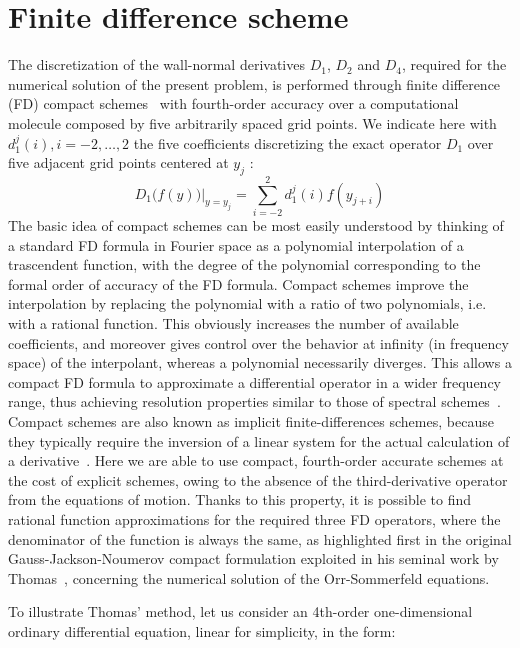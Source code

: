 \section{Finite difference scheme} \label{FD:scheme}
The discretization of the wall-normal derivatives $D_{1}$, $D_{2}$ and $D_{4}$, required for the numerical solution of the present problem, is performed through finite difference (FD) compact schemes~\cite{finite:difference:scheme} with fourth-order accuracy over a computational molecule composed by five arbitrarily spaced grid points. We indicate here with $d_{1}^{j} (i), i = -2, \dots , 2$ the five coefficients discretizing the exact operator $D_{1}$ over five adjacent grid points centered at $y_{j}$ :
\begin{equation}
D_{1} \big( f(y) \big) \vert_{y=y_{j}} = \sum_{i=-2}^{2} d_{1}^{j} (i) f(y_{j+i})
\end{equation}
The basic idea of compact schemes can be most easily understood by thinking of a standard FD formula in Fourier space as a polynomial interpolation of a trascendent function, with the degree of the polynomial corresponding to the formal order of accuracy of the FD formula. Compact schemes improve the interpolation by replacing the polynomial with a ratio of two polynomials, i.e. with a rational function. This obviously increases the number of available coefficients, and moreover gives control over the behavior at infinity (in frequency space) of the interpolant, whereas a polynomial necessarily diverges. This allows a compact FD formula to approximate a differential operator in a wider frequency range, thus achieving resolution properties similar to those of spectral schemes~\cite{finite:difference:scheme}.
Compact schemes are also known as implicit finite-differences schemes, because they typically require the inversion of a linear system for the actual calculation of a derivative~\cite{compact:difference}\cite{finite:difference:scheme}.
 Here we are able to use compact, fourth-order accurate schemes at the cost of explicit schemes, owing to the absence of the third-derivative operator from the equations of motion. Thanks to this property, it is possible to find rational function approximations for the required three FD operators, where the denominator of the function is always the same, as highlighted first in the original Gauss-Jackson-Noumerov compact formulation exploited in his seminal work by Thomas~\cite{Thomas:coeff}, concerning the numerical solution of the Orr-Sommerfeld equations.\par
To illustrate Thomas’ method, let us consider an 4th-order one-dimensional ordinary differential equation, linear for simplicity, in the form:

